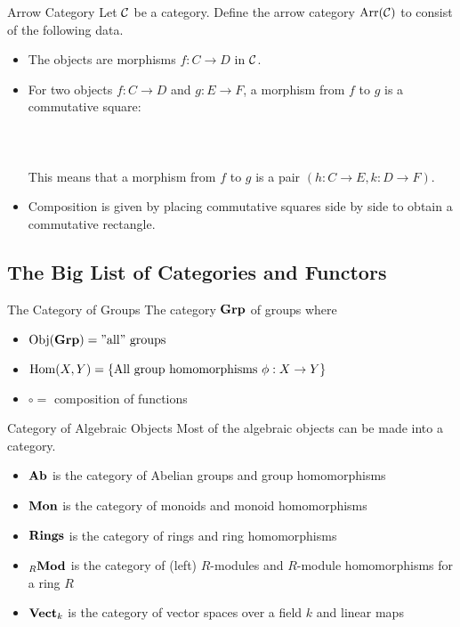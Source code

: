 \documentclass[a4paper]{article}
\begin{document}
\begin{defn}{Arrow Category}{} Let $\mathcal{C}$ be a category. Define the arrow category $\text{Arr}(\mathcal{C})$ to consist of the following data. 
\begin{itemize}
\item The objects are morphisms $f:C\to D$ in $\mathcal{C}$. 
\item For two objects $f:C\to D$ and $g:E\to F$, a morphism from $f$ to $g$ is a commutative square: \\~\\
\\~\\
This means that a morphism from $f$ to $g$ is a pair $(h:C\to E,k:D\to F)$. 
\item Composition is given by placing commutative squares side by side to obtain a commutative rectangle. 
\end{itemize}
\end{defn}

\subsection{The Big List of Categories and Functors}
\begin{defn}{The Category of Groups}{} The category $\bold{Grp}$ of groups where 
\begin{itemize}
\item $\operatorname{Obj}(\bold{Grp})=\text{''all'' groups}$
\item $\operatorname{Hom}(X,Y)=\{\text{All group homomorphisms }\phi:X\to Y\}$
\item $\circ=$ composition of functions
\end{itemize}
\end{defn}

\begin{defn}{Category of Algebraic Objects}{} Most of the algebraic objects can be made into a category. 
\begin{itemize}
\item $\bold{Ab}$ is the category of Abelian groups and group homomorphisms
\item $\bold{Mon}$ is the category of monoids and monoid homomorphisms
\item $\bold{Rings}$ is the category of rings and ring homomorphisms
\item ${_R}\bold{Mod}$ is the category of (left) $R$-modules and $R$-module homomorphisms for a ring $R$
\item $\bold{Vect}_k$ is the category of vector spaces over a field $k$ and linear maps
\end{itemize}
\end{defn}
\end{document}
